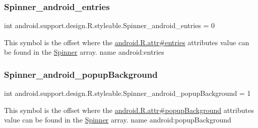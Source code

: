 \subsubsection{\texorpdfstring{Spinner\+\_\+android\+\_\+entries}{Spinner\_android\_entries}}
{\footnotesize\ttfamily int android.\+support.\+design.\+R.\+styleable.\+Spinner\+\_\+android\+\_\+entries = 0\hspace{0.3cm}{\ttfamily [static]}}

This symbol is the offset where the \hyperlink{}{android.\+R.\+attr\#entries} attribute\textquotesingle{}s value can be found in the \hyperlink{classandroid_1_1support_1_1design_1_1R_1_1styleable_ac36e55e5a1c717e866dcadd92552fa64}{Spinner} array.  name android\+:entries \mbox{\label{classandroid_1_1support_1_1design_1_1R_1_1styleable_ae1f9a39bc965c26a19d360729ee54483}} 
\subsubsection{\texorpdfstring{Spinner\+\_\+android\+\_\+popup\+Background}{Spinner\_android\_popupBackground}}
{\footnotesize\ttfamily int android.\+support.\+design.\+R.\+styleable.\+Spinner\+\_\+android\+\_\+popup\+Background = 1\hspace{0.3cm}{\ttfamily [static]}}

This symbol is the offset where the \hyperlink{}{android.\+R.\+attr\#popup\+Background} attribute\textquotesingle{}s value can be found in the \hyperlink{classandroid_1_1support_1_1design_1_1R_1_1styleable_ac36e55e5a1c717e866dcadd92552fa64}{Spinner} array.  name android\+:popup\+Background \mbox{\label{classandroid_1_1support_1_1design_1_1R_1_1styleable_a601b330e85f621a2fd8f83ea6aa87d52}} 

